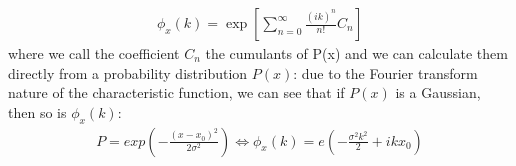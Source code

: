 \documentclass{report}
\begin{document}
\begin{align}
    \phi_x(k)=\exp \left[\sum_{n=0}^{\infty} \frac{(i k)^n}{n !} C_n\right]
\end{align}
\noindent where we call the coefficient $C_n$ the cumulants of P(x) and we can calculate them directly from a probability distribution $P(x)$:
\noindent due to the Fourier transform nature of the characteristic function, we can see that if $P(x)$ is a Gaussian, then so is $\phi_x(k)$:
\begin{align}
    P = exp\left(-\frac{\left(x-x_0\right)^2}{2\sigma^2}\right) \Leftrightarrow \phi_x(k) = e\left(-\frac{\sigma^2 k^2}{2}+i k x_0\right)
\end{align}
\end{document}
